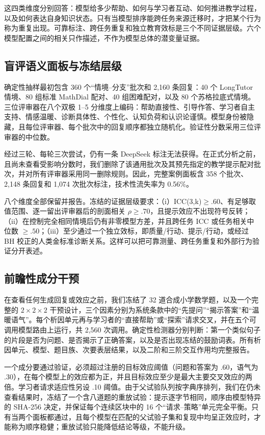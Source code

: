 \documentclass[11pt,a4paper,UTF8]{ctexart}
\begin{document}
这四类维度分别回答：模型给多少帮助、如何与学习者互动、如何推进教学过程，以及如何表达自身知识状态。只有当模型排序能跨任务来源迁移时，才把某个行为称为重复出现。可靠标注、跨任务重复和独立教育效标是三个不同证据层级。六个模型配置之间的相关只作描述，不作为模型总体的潜变量证据。

\subsection{盲评语义面板与冻结层级}

确定性抽样最初包含 360 个“情境--分支”批次和 2,160 条回复：40 个 LongTutor 情境、80 组标准 MathDial 配对、40 组困难配对，以及 80 个苏格拉底式情境。三位评审器在八个双极 1--5 分维度上编码：帮助直接性、引导作答、学习者自主支持、情感温暖、诊断具体性、个性化、认知负荷和认识论谨慎。模型身份被隐藏，且每位评审器、每个批次中的回复顺序都独立随机化。验证性分数采用三位评审器的中位数。

经过三轮、每轮三次尝试，仍有一条 DeepSeek 标注无法获得。在正式分析之前，且尚未查看受影响分数时，我们删除了该通用批次及其预先指定的教学提示配对批次，并对所有评审器采用同一删除规则。因此，完整案例面板含 358 个批次、2,148 条回复和 1,074 次批次标注，技术性流失率为 0.56\%。

八个维度全部保留并报告。冻结的证据层级要求：（i）ICC(3,k)$\geq .60$、有足够取值范围、逐一留出评审器后的剖面相关 $\rho\geq .70$，且提示效应不出现符号反转；（ii）在控制完全相同情境后仍有非零模型方差，并且跨任务 ICC 或任务相关中位数 $\geq .50$；（iii）至少通过一个独立效标，即质量/行动、提示/行动，或经过 BH 校正的人类金标准诊断关系。这样可以把可靠测量、跨任务重复和外部行为验证分开表述。

\subsection{前瞻性成分干预}

在查看任何生成回复或效应之前，我们冻结了 32 道合成小学数学题，以及一个完整的 $2\times2\times2$ 干预设计，三个因素分别为系统条款中的“先提问”“揭示答案”和“温暖语气”。每个析因单元再与学习者的“直接帮助”或“探索”请求交叉，并在五个可调用模型路由上运行，共 2,560 次调用。确定性检测器分别判断：第一个类似句子的片段是否为问题、是否揭示了正确答案，以及是否出现冻结的鼓励词表。所有析因单元、模型、题目族、次要表层结果，以及二阶和三阶交互作用均完整报告。

一个成分要通过验证，必须超过注册的目标效应阈值（问题和答案为 .60，语气为 .30），在每个模型上的效应都为正，并且目标效应至少是最大主要交叉效应的两倍。学习者请求适应性另设 .10 阈值。由于父试验队列按字典序排列，我们在仍未查看结果时，冻结了一个含八道题的重放试验：提示逐字节相同，顺序由模型特异的 SHA-256 决定，并保证每个连续区块中的 16 个“请求--策略”单元完全平衡。只有当两个面板都通过，且每个模型在匹配的父试验子集和复现中均呈正效应时，才能称为顺序稳健；重放试验只能降低结论等级，不能升级。
\end{document}
